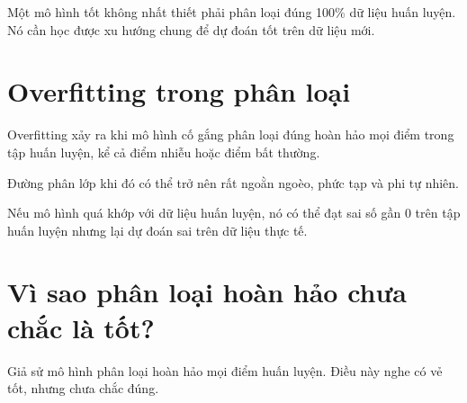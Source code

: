 \documentclass[12pt,a4paper]{report}
\begin{document}
\begin{ghinho}
Một mô hình tốt không nhất thiết phải phân loại đúng 100\% dữ liệu huấn luyện. Nó cần học được xu hướng chung để dự đoán tốt trên dữ liệu mới.
\end{ghinho}

\section{Overfitting trong phân loại}

Overfitting xảy ra khi mô hình cố gắng phân loại đúng hoàn hảo mọi điểm trong tập huấn luyện, kể cả điểm nhiễu hoặc điểm bất thường.

Đường phân lớp khi đó có thể trở nên rất ngoằn ngoèo, phức tạp và phi tự nhiên.

\begin{center}
\end{center}

\begin{canhbao}
Nếu mô hình quá khớp với dữ liệu huấn luyện, nó có thể đạt sai số gần 0 trên tập huấn luyện nhưng lại dự đoán sai trên dữ liệu thực tế.
\end{canhbao}

\section{Vì sao phân loại hoàn hảo chưa chắc là tốt?}

Giả sử mô hình phân loại hoàn hảo mọi điểm huấn luyện. Điều này nghe có vẻ tốt, nhưng chưa chắc đúng.
\end{document}
